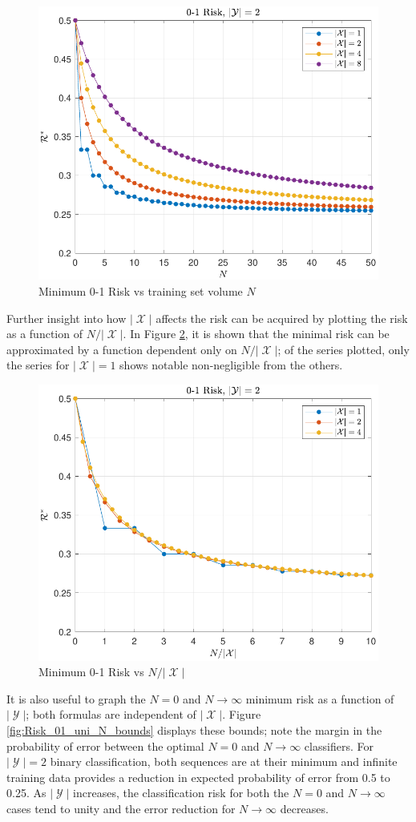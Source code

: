 \documentclass[12pt]{report}
\DeclareMathOperator{\Xcal}{\mathcal{X}}
\DeclareMathOperator{\Ycal}{\mathcal{Y}}
\begin{document}
\begin{figure}
\centering
\includegraphics[width=0.7\linewidth]{Risk_01_uni_N_leg_Mx.pdf}
\caption{Minimum 0-1 Risk vs training set volume $N$}
\label{fig:Risk_01_uni_N_leg_Mx}
\end{figure}

Further insight into how $|\Xcal|$ affects the risk can be acquired by plotting the risk as a function of $N/|\Xcal|$. In Figure \ref{fig:Risk_01_uni_N-Mx}, it is shown that the minimal risk can be approximated by a function dependent only on $N/|\Xcal|$; of the series plotted, only the series for $|\Xcal| = 1$ shows notable non-negligible from the others.

\begin{figure}
\centering
\includegraphics[width=0.7\linewidth]{Risk_01_uni_N-Mx.pdf}
\caption{Minimum 0-1 Risk vs $N/|\Xcal|$}
\label{fig:Risk_01_uni_N-Mx}
\end{figure}


It is also useful to graph the $N=0$ and $N \to \infty$ minimum risk as a function of $|\Ycal|$; both formulas are independent of $|\Xcal|$. Figure \ref{fig:Risk_01_uni_N_bounds} displays these bounds; note the margin in the probability of error between the optimal $N=0$ and $N \to \infty$ classifiers. For $|\Ycal| = 2$ binary classification, both sequences are at their minimum and infinite training data provides a reduction in expected probability of error from 0.5 to 0.25. As $|\Ycal|$ increases, the classification risk for both the $N=0$ and $N \to \infty$ cases tend to unity and the error reduction for $N \to \infty$ decreases. 
\end{document}
